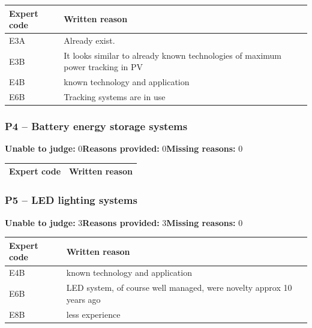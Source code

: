 \begin{tabularx}{\linewidth}{@{}lX@{}}
\toprule
Expert code & Written reason \\
\midrule
E3A & Already exist. \\
E3B & It looks similar to already known technologies of maximum power tracking in PV \\
E4B & known technology and application \\
E6B & Tracking systems are in use \\
\bottomrule
\end{tabularx}

\medskip

\subsubsection*{P4 -- Battery energy storage systems}
\noindent \textbf{Unable to judge:} 0\quad \textbf{Reasons provided:} 0\quad \textbf{Missing reasons:} 0

\begin{tabularx}{\linewidth}{@{}lX@{}}
\toprule
Expert code & Written reason \\
\midrule
\bottomrule
\end{tabularx}

\medskip

\subsubsection*{P5 -- LED lighting systems}
\noindent \textbf{Unable to judge:} 3\quad \textbf{Reasons provided:} 3\quad \textbf{Missing reasons:} 0

\begin{tabularx}{\linewidth}{@{}lX@{}}
\toprule
Expert code & Written reason \\
\midrule
E4B & known technology and application \\
E6B & LED system, of course well managed, were novelty approx 10 years ago \\
E8B & less experience \\
\bottomrule
\end{tabularx}

\medskip
